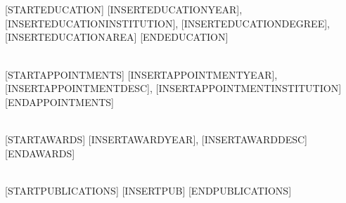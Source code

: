 

\NameBoldface{\color{\NameColor}{\NameSize [INSERTNAME] ([INSERTROLE]):}}\\
[INSERTAFFILIATION]

\SectionSpacing
{}\\
[STARTEDUCATION]
[INSERTEDUCATIONYEAR], [INSERTEDUCATIONINSTITUTION], [INSERTEDUCATIONDEGREE], [INSERTEDUCATIONAREA]
[ENDEDUCATION]

\SectionSpacing
{}\\
[STARTAPPOINTMENTS]
[INSERTAPPOINTMENTYEAR], [INSERTAPPOINTMENTDESC], [INSERTAPPOINTMENTINSTITUTION]
[ENDAPPOINTMENTS]

\SectionSpacing
{}\\
[STARTAWARDS]
[INSERTAWARDYEAR], [INSERTAWARDDESC]
[ENDAWARDS]

\SectionSpacing
{}\\
[STARTPUBLICATIONS]
{\PublicationBullet}[INSERTPUB]
[ENDPUBLICATIONS]
